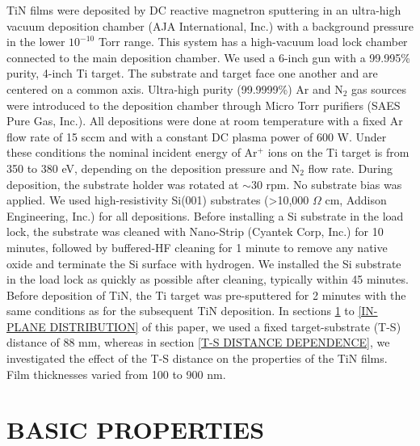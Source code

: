 \documentclass{report}
\begin{document}
TiN films were deposited by DC reactive magnetron sputtering in an ultra-high vacuum deposition chamber (AJA International, Inc.) with a background pressure in the lower  $10^{-10}$ Torr range. This system has a high-vacuum load lock chamber connected to the main deposition chamber. We used a 6-inch gun with a 99.995\% purity, 4-inch Ti target. The substrate and target face one another and are centered on a common axis. Ultra-high purity (99.9999\%) Ar and N$_{2}$ gas sources were introduced to the deposition chamber through Micro Torr purifiers (SAES Pure Gas, Inc.). All depositions were done at room temperature with a fixed Ar flow rate of 15 sccm and with a constant DC plasma power of 600 W.  Under these conditions the nominal incident energy of Ar$^{+}$ ions on the Ti target is from 350 to 380 eV, depending on the deposition pressure and N$_{2}$ flow rate.  During deposition, the substrate holder was rotated at $\sim$30 rpm. No substrate bias was applied. We used high-resistivity Si(001) substrates (>10,000 $\Omega$ cm, Addison Engineering, Inc.) for all depositions. Before installing a Si substrate in the load lock, the substrate was cleaned with Nano-Strip (Cyantek Corp, Inc.) for 10 minutes, followed by buffered-HF cleaning for 1 minute to remove any native oxide and terminate the Si surface with hydrogen. We installed the Si substrate in the load lock as quickly as possible after cleaning, typically within 45 minutes. Before deposition of TiN, the Ti target was pre-sputtered for 2 minutes with the same conditions as for the subsequent TiN deposition. In sections \ref{BASIC PROPERTIES} to \ref{IN-PLANE DISTRIBUTION} of this paper, we used a fixed target-substrate (T-S) distance of 88 mm, whereas in section \ref{T-S DISTANCE DEPENDENCE}, we investigated the effect of the T-S distance on the properties of the TiN films.  Film thicknesses varied from 100 to 900 nm.

\section{BASIC PROPERTIES}
\label{BASIC PROPERTIES}
\end{document}
